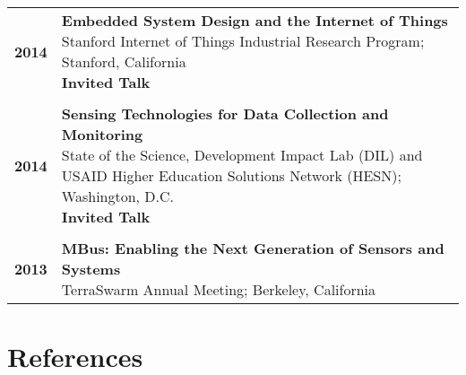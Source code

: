 \documentclass{article}
\begin{document}
\begin{longtable}{>{\bf}p{1cm} l}
  \\

  2014 & \makecell{
    \textbf{Embedded System Design and the Internet of Things} \\
    Stanford Internet of Things Industrial Research Program; Stanford, California \\
    \textbf{\color{BrickRed} Invited Talk} \\
  } \\

  \\

  2014 & \makecell{
    \textbf{Sensing Technologies for Data Collection and Monitoring} \\
    State of the Science, Development Impact Lab (DIL) and USAID Higher Education Solutions Network (HESN); Washington, D.C. \\
    \textbf{\color{BrickRed} Invited Talk} \\
  } \\

  \\

  2013 & \makecell{
    \textbf{MBus: Enabling the Next Generation of Sensors and Systems} \\
    TerraSwarm Annual Meeting; Berkeley, California \\
  } \\
\end{longtable}

\renewcommand{\arraystretch}{1.0}



\section*{References}
\end{document}
